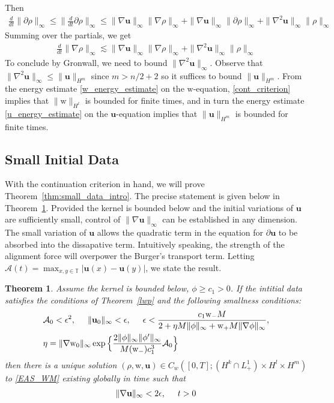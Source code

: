 \documentclass[11pt,letterpaper]{amsart}
\theoremstyle{plain}
\newtheorem{theorem}[THEOREM]{Theorem}
\theoremstyle{definition}
\theoremstyle{remark}
\newcommand{\thm}[1]{Theorem~\ref{#1}}
\newcommand{\T}{\ensuremath{\mathbb{T}}}   %
\def \cA {\mathcal{A}}
\renewcommand{\geq}{\geqslant}
\renewcommand{\leq}{\leqslant}
\def\T{\mathbb{T}}
\def\u{\textbf{u}}
\def \wt {\mathrm{w}}
\begin{document}
Then 
\begin{align*}
    \frac{d}{dt}\|\partial \rho\|_{\infty} 
        \leq \| \frac{d}{dt} \partial \rho \|_{\infty} 
        \leq \| \nabla \u\|_{\infty} \| \nabla \rho \|_{\infty} + \|\nabla \u\|_{\infty} \|\partial \rho\|_{\infty} + \| \nabla^2 \u\|_{\infty} \|\rho\|_{\infty} 
\end{align*}
Summing over the partials, we get 
\begin{align*}
    \frac{d}{dt}\|\nabla \rho\|_{\infty} 
        \lesssim \| \nabla \u\|_{\infty} \| \nabla \rho \|_{\infty} + \| \nabla^2 \u\|_{\infty} \|\rho\|_{\infty} 
\end{align*}
To conclude by Gronwall, we need to bound $\| \nabla^2 \u\|_{\infty}$. 
Observe that $\| \nabla^2 \u\|_{\infty} \leq \|\u\|_{H^m}$ since $m > n/2 + 2$ so 
it suffices to bound $\|\u\|_{H^m}$. 
From the energy estimate \eqref{w_energy_estimate} on the $\wt$-equation, \eqref{cont_criterion} implies that $\| \wt \|_{H^l}$ is bounded
for finite times, and in turn the energy estimate \eqref{u_energy_estimate} on the $\u$-equation implies that $\|\u\|_{H^m}$ is 
bounded for finite times. 




\subsection{Small Initial Data}
With the continuation criterion in hand, we will prove \thm{thm:small_data_intro}. The precise 
statement is given below in \thm{small_data}. 
Provided the kernel is bounded below and the initial variations of $\u$ are sufficiently small, control 
of $\|\nabla \u\|_{\infty}$ can be established in any dimension.  The small variation of $\u$ allows 
the quadratic term in the equation for $\partial \u$ to be absorbed into the dissapative term. 
Intuitively speaking, the strength of the alignment force will overpower the Burger's transport term.  
Letting $\cA(t) = \max_{x,y \in \T} |\u(x) - \u(y)|$, we state the result.
\begin{theorem}
    \label{small_data}
    Assume the kernel is bounded below, $\phi \geq c_1 > 0$.  If the intitial 
    data satisfies the conditions of \thm{lwp} and the following smallness conditions: 
    \begin{align*}
        &\cA_0 < \epsilon^2, \hspace{5mm} \|\u_0\|_{\infty} < \epsilon, \hspace{5mm} \epsilon < \frac{c_1 \wt_- M}{2 + \eta  M \|\phi\|_{\infty} + \wt_+ M \|\nabla \phi\|_{\infty}}, \\
        &\eta = \|\nabla \wt_0\|_{\infty} \exp \Big\{ \frac{2 \|\phi\|_{\infty} \|\phi'\|_{\infty}}{M (\wt_-) c_1^3} \cA_0 \Big\}
    \end{align*}
    then there is a unique solution 
    $(\rho, \wt, \u) \in C_w([0,T]; (H^k \cap L^1_+) \times H^l \times H^m)$ to \eqref{EAS_WM}
    existing globally in time such that 
    \begin{align*}
        \| \nabla \u \|_{\infty} < 2 \epsilon, \hspace{5mm} t > 0 
    \end{align*}
\end{theorem}
\end{document}
